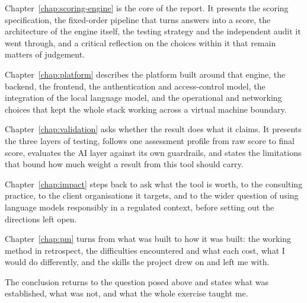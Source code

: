 Chapter~\ref{chap:scoring-engine} is the core of the report. It presents the
scoring specification, the fixed-order pipeline that turns answers into a
score, the architecture of the engine itself, the testing strategy and the
independent audit it went through, and a critical reflection on the choices
within it that remain matters of judgement.

Chapter~\ref{chap:platform} describes the platform built around that engine,
the backend, the frontend, the authentication and access-control model, the
integration of the local language model, and the operational and networking
choices that kept the whole stack working across a virtual machine boundary.

Chapter~\ref{chap:validation} asks whether the result does what it claims. It
presents the three layers of testing, follows one assessment profile from raw
score to final score, evaluates the AI layer against its own guardrails, and
states the limitations that bound how much weight a result from this tool
should carry.

Chapter~\ref{chap:impact} steps back to ask what the tool is worth, to the
consulting practice, to the client organisations it targets, and to the wider
question of using language models responsibly in a regulated context, before
setting out the directions left open.

Chapter~\ref{chap:pm} turns from what was built to how it was built: the
working method in retrospect, the difficulties encountered and what each cost,
what I would do differently, and the skills the project drew on and left me
with.

The conclusion returns to the question posed above and states what was
established, what was not, and what the whole exercise taught me.